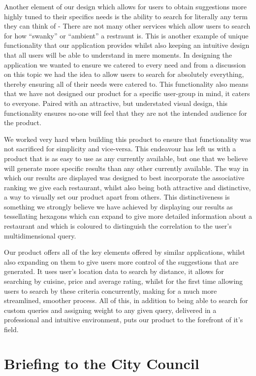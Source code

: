 \documentclass[10pt,a4paper]{article}
\begin{document}
Another element of our design which allows for users to obtain suggestions more highly tuned to their specifics needs is the ability to search for literally any term they can think of - There are not many other services which allow users to search for how “swanky” or “ambient” a restraunt is. This is another example of unique functionality that our application provides whilst also keeping an intuitive design that all users will be able to understand in mere moments. In designing the application we wanted to ensure we catered to every need and from a discussion on this topic we had the idea to allow users to search for absolutely everything, thereby ensuring all of their needs were catered to. This functionality also means that we have not designed our product for a specific user-group in mind, it caters to everyone. Paired with an attractive, but understated visual design, this functionality ensures no-one will feel that they are not the intended audience for the product.

We worked very hard when building this product to ensure that functionality was not sacrificed for simplicity and vice-versa. This endeavour has left us with a product that is as easy to use as any currently available, but one that we believe will generate more specific results than any other currently available. The way in which our results are displayed was designed to best incorporate the associative ranking we give each restaurant, whilst also being both attractive and distinctive, a way to visually set our product apart from others. This distinctiveness is something we strongly believe we have achieved by displaying our results as tessellating hexagons which can expand to give more detailed information about a restaurant and which is coloured to distinguish the correlation to the user’s multidimensional query.

Our product offers all of the key elements offered by similar applications, whilst also expanding on them to give users more control of the suggestions that are generated. It uses user’s location data to search by distance, it allows for searching by cuisine, price and average rating, whilst for the first time allowing users to search by these criteria concurrently, making for a much more streamlined, smoother process. All of this, in addition to being able to search for custom queries and assigning weight to any given query, delivered in a professional and intuitive environment, puts our product to the forefront of it’s field. 

\section*{Briefing to the City Council}
\end{document}
